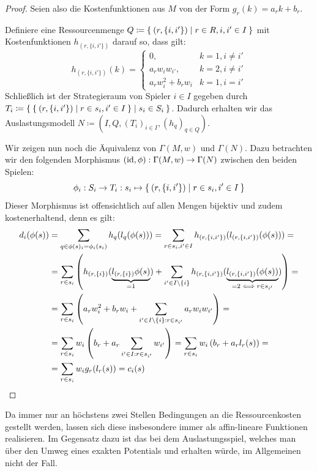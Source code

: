 \begin{proof}
	Seien also die Kostenfunktionen aus $M$ von der Form $g_r(k) = a_r k + b_r$.
	
	Definiere eine Ressourcenmenge $Q \coloneqq \Set{(r, \{i, i'\}) | r \in R, i,i' \in I}$ mit Kostenfunktionen $h_{(r, \{i,i'\})}$ darauf so, dass gilt:
	\[h_{(r, \{i,i'\})} (k) = \begin{cases}
	0, 					& k=1, i \neq i' \\
	a_r w_i w_{i'}, 	& k=2, i \neq i' \\
	a_r w_i^2 + b_r w_i	& k=1, i = i'
	\end{cases} \]
	Schließlich ist der Strategieraum von Spieler $i \in I$ gegeben durch $T_i \coloneqq \Set{\Set{(r, \{i, i'\}) | r \in s_i, i' \in I} | s_i \in S_i }$. Dadurch erhalten wir das Auslastungsmodell $N \coloneqq (I, Q, (T_i)_{i \in I}, (h_q)_{q \in Q})$. 
	
	Wir zeigen nun noch die Äquivalenz von $\Gamma(M,w)$ und $\Gamma(N)$. Dazu betrachten wir den folgenden Morphismus $(\mathrm{id}, \phi): \Gamma(M,w) \to \Gamma(N)$ zwischen den beiden Spielen:
	\[\phi_i: S_i \to T_i: s_i \mapsto \Set{(r, \{i, i'\}) | r \in s_i, i' \in I}\]
	Dieser Morphismus ist offensichtlich auf allen Mengen bijektiv und zudem kostenerhaltend, denn es gilt:
	\begin{align*}
	d_i(\phi(s)) 	&= \sum_{q \in \phi(s)_i = \phi_i(s_i)} h_q(l_q(\phi(s))) = \sum_{r \in s_i, i' \in I} h_{(r, \{i,i'\})}(l_{(r, \{i,i'\})}(\phi(s))) = \\
	&= \sum_{r \in s_i} \left(h_{(r, \{i\})}(\underbrace{l_{(r, \{i\})}\phi(s)}_{=1}) + \sum_{i' \in I\setminus\{i\}} h_{(r, \{i, i'\})}(\underbrace{l_{(r, \{i, i'\})}(\phi(s))}_{=2 \iff r \in s_{i'}})\right) = \\
	&= \sum_{r \in s_i}\left( a_r w_i^2 + b_r w_i + \sum_{i' \in I\setminus\{i\}: r \in s_{i'}} a_r w_i w_{i'}\right) = \\
	&= \sum_{r \in s_i}w_i \left( b_r + a_r \sum_{i' \in I: r \in s_{i'}}w_{i'} \right) = \sum_{r \in s_i}w_i \left( b_r + a_r l_r(s)\right) = \\
	&= \sum_{r \in s_i}w_i g_r(l_r(s)) = c_i(s) \qedhere
	\end{align*}
\end{proof}

\begin{bem}
	Da immer nur an höchstens zwei Stellen Bedingungen an die Ressourcenkosten gestellt werden, lassen sich diese insbesondere immer als affin-lineare Funktionen realisieren. Im Gegensatz dazu ist das bei dem Auslastungsspiel, welches man über den Umweg eines exakten Potentials und  erhalten würde, im Allgemeinen nicht der Fall.
\end{bem}

